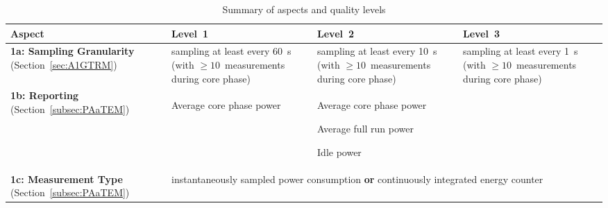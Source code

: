 \newlength{\tablecolumnwidth}
\setlength{\tablecolumnwidth}{3.5cm}
\noindent
\begin{table}
\caption{Summary of aspects and quality levels}
\label{tab:levels}
\begin{tabular}{|p{3cm}|p{3.5cm}|p{3.5cm}|p{3.5cm}|} \hline
\textbf{Aspect}&\textbf{Level~1}&\textbf{Level~2}&\textbf{Level~3}\\ \hline

\textbf{1a: Sampling Granularity } (Section~\ref{sec:A1GTRM})&
\begin{minipage}[t]{\tablecolumnwidth}
      sampling at least every \qty{60}{\second} (with $\ge10$~measurements during core phase)
\end{minipage} &
\begin{minipage}[t]{\tablecolumnwidth}
      sampling at least every \qty{10}{\second} (with $\ge10$~measurements during core phase)
\end{minipage} &
\begin{minipage}[t]{\tablecolumnwidth}
      sampling at least every \qty{1}{\second} (with $\ge10$~measurements during core phase)
\end{minipage}
\\
\hline


\textbf{1b: Reporting } (Section~\ref{subsec:PAaTEM}) &
\begin{minipage}[t]{\tablecolumnwidth}
      \begin{compactitemize}
            \item Average core phase power
      \end{compactitemize}
\end{minipage} &
\multicolumn{2}{p{2\tablecolumnwidth}|}{
      \begin{minipage}[t]{2\tablecolumnwidth}
            \begin{compactitemize}
                  \item Average core phase power
                  \item Average full run power
                  \item Idle power
            \end{compactitemize}
      \end{minipage}
} \\
\hline

\textbf{1c: Measurement Type} (Section~\ref{subsec:PAaTEM}) &
\multicolumn{3}{p{3\tablecolumnwidth}|}{
      instantaneously sampled power consumption \textbf{or} continuously integrated energy counter
} \\
\hline


\end{tabular}
\end{table}
